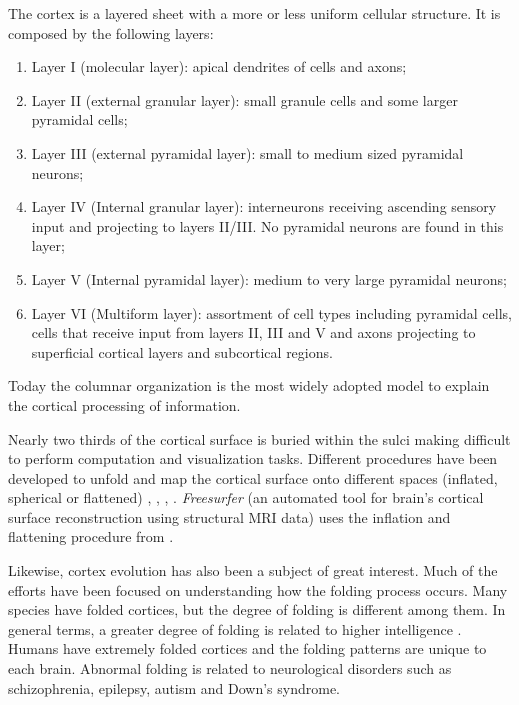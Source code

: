\documentclass[a4paper,twoside]{article}
\begin{document}
The cortex is a layered sheet with a more or less uniform cellular structure. 
It is composed by the following layers:
\begin{enumerate}
 \item Layer I (molecular layer): apical dendrites of cells and axons; 
 \item Layer II (external granular layer): small granule cells and some larger pyramidal cells;
 \item Layer III (external pyramidal layer): small to medium sized pyramidal neurons;
 \item Layer IV (Internal granular layer): interneurons receiving ascending sensory input and projecting to layers II/III. No pyramidal neurons are found in this layer;
 \item Layer V (Internal pyramidal layer): medium to very large pyramidal neurons; 
 \item Layer VI (Multiform layer): assortment of cell types including pyramidal cells, cells that receive input from layers II, III and V and 
       axons projecting to superficial cortical layers and subcortical regions.
\end{enumerate}
Today the columnar organization is the most widely adopted model to explain the cortical processing of information.


Nearly two thirds of the cortical surface is buried within the sulci making difficult to perform computation and visualization tasks. 
Different procedures have been developed to unfold and map the cortical surface onto different spaces (inflated, spherical or flattened)
\cite{drury_computerized_1996}, \cite{hermosillo_unfolding_1999}, \cite{fischl_cortical_1999}, \cite{pons_area_2004}. %
\textit{Freesurfer} (an automated tool for brain's cortical surface reconstruction using structural MRI data) uses the inflation and flattening procedure from \cite{fischl_cortical_1999}. 

Likewise, cortex evolution has also been a subject of great interest.
Much of the efforts have been focused on understanding how the folding process occurs.
Many species have folded cortices, but the degree of folding is different among them.
In general terms, a greater degree of folding is related to higher intelligence \cite{buettner1964evolutionary}.
Humans have extremely folded cortices and the folding patterns are 
unique to each brain. Abnormal folding is related to 
neurological disorders such as schizophrenia, epilepsy, autism and Down's syndrome.
\end{document}
